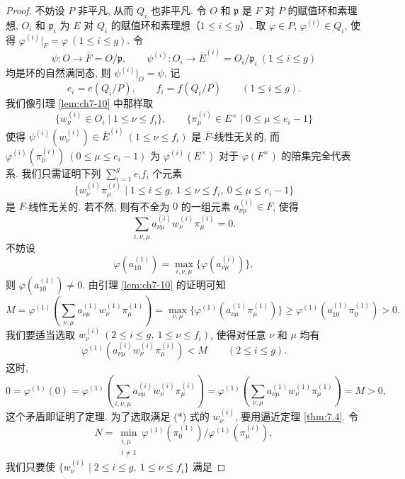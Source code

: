 \begin{proof}
不妨设 $P$ 非平凡, 从而 $Q_i$ 也非平凡. 令 $O$ 和 $\mathfrak{p}$ 是 $F$ 对 $P$ 的赋值环和素理想, $O_i$ 和 $\mathfrak{p}_i$ 为 $E$ 对 $Q_i$ 的赋值环和素理想（$1\leqslant i\leqslant g$）. 取 $\varphi\in P$, $\varphi^{(i)}\in Q_i$, 使得 $\varphi^{(i)}|_F=\varphi\ (1\leqslant i\leqslant g)$. 令
\[
  \psi\colon O\to\overline{F}=O/\mathfrak{p},\qquad
  \psi^{(i)}\colon O_i\to\overline{E}^{(i)}=O_i/\mathfrak{p}_i\ (1\leqslant i\leqslant g)
\]
均是环的自然满同态, 则 $\psi^{(i)}|_O=\psi$. 记
\[
  e_i=e(Q_i/P),\qquad f_i=f(Q_i/P)\qquad(1\leqslant i\leqslant g).
\]
我们像引理 \ref{lem:ch7-10} 中那样取
\[
  \{w_{\nu}^{(i)}\in O_i\mid 1\leqslant\nu\leqslant f_i\},\qquad
  \{\pi_{\mu}^{(i)}\in E^{\times}\mid 0\leqslant\mu\leqslant e_i-1\}
\]
使得 $\psi^{(i)}(w_{\nu}^{(i)})\in\overline{E}^{(i)}\ (1\leqslant\nu\leqslant f_i)$ 是 $\overline{F}$-线性无关的, 而 $\varphi^{(i)}(\pi_{\mu}^{(i)})\ (0\leqslant\mu\leqslant e_i-1)$ 为 $\varphi^{(i)}(E^{\times})$ 对于 $\varphi(F^{\times})$ 的陪集完全代表系. 我们只需证明下列 $\sum_{i=1}^{g}e_if_i$ 个元素
\[
  \{w_{\nu}^{(i)}\pi_{\mu}^{(i)}\mid 1\leqslant i\leqslant g,\ 1\leqslant\nu\leqslant f_i,\ 0\leqslant\mu\leqslant e_i-1\}
\]
是 $F$-线性无关的. 若不然, 则有不全为 $0$ 的一组元素 $a_{\nu\mu}^{(i)}\in F$, 使得
\[
  \sum_{i,\nu,\mu}a_{\nu\mu}^{(i)}w_{\nu}^{(i)}\pi_{\mu}^{(i)}=0.
\]
不妨设
\[
  \varphi(a_{10}^{(1)})=\max_{i,\nu,\mu}\{\varphi(a_{\nu\mu}^{(i)})\},
\]
则 $\varphi(a_{10}^{(1)})\neq 0$. 由引理 \ref{lem:ch7-10} 的证明可知
\[
  M=\varphi^{(1)}\left(\sum_{\nu,\mu}a_{\nu\mu}^{(1)}w_{\nu}^{(1)}\pi_{\mu}^{(1)}\right)
  =\max_{\nu,\mu}\{\varphi^{(1)}(a_{\nu\mu}^{(1)}\pi_{\mu}^{(1)})\}
  \geqslant\varphi^{(1)}(a_{10}^{(1)}\pi_0^{(1)})>0.
\]
我们要适当选取 $w_{\nu}^{(i)}\ (2\leqslant i\leqslant g,\ 1\leqslant\nu\leqslant f_i)$, 使得对任意 $\nu$ 和 $\mu$ 均有
\begin{equation}\tag{*}
  \varphi^{(1)}\left(a_{\nu\mu}^{(i)}w_{\nu}^{(i)}\pi_{\mu}^{(i)}\right)<M\qquad(2\leqslant i\leqslant g).
\end{equation}
这时,
\[
  0=\varphi^{(1)}(0)=\varphi^{(1)}\left(\sum_{i,\nu,\mu}a_{\nu\mu}^{(i)}w_{\nu}^{(i)}\pi_{\mu}^{(i)}\right)
  =\varphi^{(1)}\left(\sum_{\nu,\mu}a_{\nu\mu}^{(1)}w_{\nu}^{(1)}\pi_{\mu}^{(1)}\right)=M>0,
\]
这个矛盾即证明了定理. 为了选取满足 (*) 式的 $w_{\nu}^{(i)}$, 要用逼近定理 \ref{thm:7.4}. 令
\[
  N=\min_{\substack{i,\mu\\ i\neq 1}}\varphi^{(1)}(\pi_0^{(1)})/\varphi^{(1)}(\pi_{\mu}^{(i)}),
\]
我们只要使 $\{w_{\nu}^{(i)}\mid 2\leqslant i\leqslant g,\ 1\leqslant\nu\leqslant f_i\}$ 满足

\end{proof}
